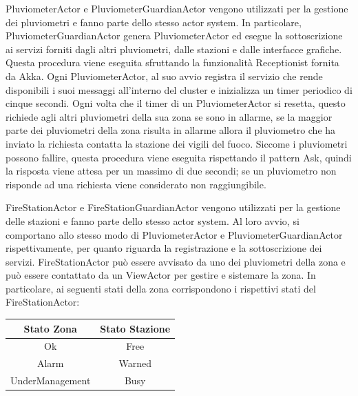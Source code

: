 \documentclass[12pt,a4paper,openright,twoside]{book}
\begin{document}
PluviometerActor e PluviometerGuardianActor vengono utilizzati per la gestione dei pluviometri e fanno parte dello stesso actor system. In particolare, PluviometerGuardianActor genera PluviometerActor ed esegue la sottoscrizione ai servizi forniti dagli altri pluviometri, dalle stazioni e dalle interfacce grafiche. Questa procedura viene eseguita sfruttando la funzionalità Receptionist fornita da Akka.
Ogni PluviometerActor, al suo avvio registra il servizio che rende disponibili i suoi messaggi all'interno del cluster e inizializza un timer periodico di cinque secondi. Ogni volta che il timer di un PluviometerActor si resetta, questo richiede agli altri pluviometri della sua zona se sono in allarme, se la maggior parte dei pluviometri della zona risulta in allarme allora il pluviometro che ha inviato la richiesta contatta la stazione dei vigili del fuoco. Siccome i pluviometri possono fallire, questa procedura viene eseguita rispettando il pattern Ask, quindi la risposta viene attesa per un massimo di due secondi; se un pluviometro non risponde ad una richiesta viene considerato non raggiungibile.

FireStationActor e FireStationGuardianActor vengono utilizzati per la gestione delle stazioni e fanno parte dello stesso actor system. Al loro avvio, si comportano allo stesso modo di PluviometerActor e PluviometerGuardianActor rispettivamente, per quanto riguarda la registrazione e la sottoscrizione dei servizi.
FireStationActor può essere avvisato da uno dei pluviometri della zona e può essere contattato da un ViewActor per gestire e sistemare la zona. In particolare, ai seguenti stati della zona corrispondono i rispettivi stati del FireStationActor:
\begin{table}[h!]
	\centering
	\begin{tabular}{ |c|c| }
    \hline
	\textbf{Stato Zona} & \textbf{Stato Stazione} \\
	\hline
	Ok & Free \\
	\hline
	Alarm & Warned \\
	\hline
	UnderManagement & Busy \\
	\hline
	\end{tabular}
\end{table}
\end{document}
